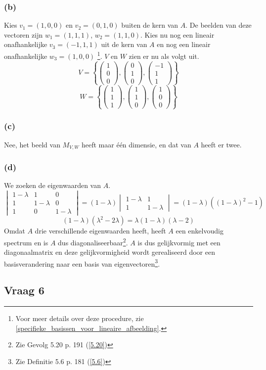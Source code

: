 \documentclass[lineaire_algebra_oplossingen.tex]{subfiles}
\begin{document}
\subsubsection*{(b)}
Kies $v_1 = (1,0,0)$ en $v_2 = (0,1,0)$ buiten de kern van $A$. De beelden van deze vectoren zijn $w_1=(1,1,1)$, $w_2=(1,1,0)$. Kies nu nog een lineair onafhankelijke $v_3=(-1,1,1)$ uit de kern van $A$ en nog een lineair onafhankelijke $w_3 = (1,0,0)$ \footnote{Voor meer details over deze procedure, zie \ref{specifieke_basissen_voor_lineaire_afbeelding}.}.
$V$ en $W$ zien er nu als volgt uit.
\[
V = 
\left\{
\begin{pmatrix}
1\\0\\0
\end{pmatrix}
,
\begin{pmatrix}
0\\1\\0
\end{pmatrix}
,
\begin{pmatrix}
-1\\1\\1
\end{pmatrix}
\right\}
\]
\[
W = 
\left\{
\begin{pmatrix}
1\\1\\1
\end{pmatrix}
,
\begin{pmatrix}
1\\1\\0
\end{pmatrix}
,
\begin{pmatrix}
1\\0\\0
\end{pmatrix}
\right\}
\]

\subsubsection*{(c)}
Nee, het beeld van $M_{V,W}$ heeft maar \'e\'en dimensie, en dat van $A$ heeft er twee.

\subsubsection*{(d)}
We zoeken de eigenwaarden van $A$.
\[
\begin{vmatrix}
1-\lambda & 1 & 0\\
1 & 1-\lambda & 0\\
1 & 0 & 1-\lambda
\end{vmatrix}
=
(1-\lambda)
\begin{vmatrix}
1-\lambda & 1\\
1 & 1-\lambda
\end{vmatrix}
=
(1-\lambda)((1-\lambda)^2-1)
\]
\[
(1-\lambda)(\lambda^2-2\lambda)
=
\lambda(1-\lambda)(\lambda-2)
\]
Omdat $A$ drie verschillende eigenwaarden heeft, heeft $A$ een enkelvoudig spectrum en is $A$ dus diagonaliseerbaar\footnote{Zie Gevolg 5.20 p. 191 (\ref{5.20})}. $A$ is dus gelijkvormig met een diagonaalmatrix en deze gelijkvormigheid wordt gerealiseerd door een basisverandering naar een basis van eigenvectoren\footnote{Zie Definitie 5.6 p. 181 (\ref{5.6})}.



\subsection{Vraag 6}
\end{document}
